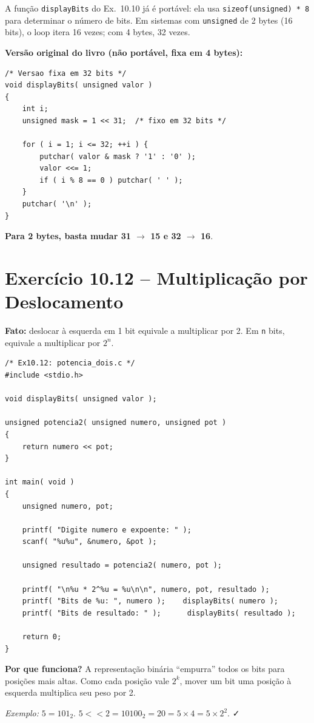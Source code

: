 \documentclass[12pt,a4paper]{article}
\begin{document}
\begin{respostabox}
A função \texttt{displayBits} do Ex.~10.10 já é portável: ela usa
\texttt{sizeof(unsigned) * 8} para determinar o número de bits. Em sistemas com
\texttt{unsigned} de 2 bytes (16 bits), o loop itera 16 vezes; com 4 bytes,
32 vezes.

\textbf{Versão original do livro (não portável, fixa em 4 bytes):}
\begin{lstlisting}
/* Versao fixa em 32 bits */
void displayBits( unsigned valor )
{
    int i;
    unsigned mask = 1 << 31;  /* fixo em 32 bits */

    for ( i = 1; i <= 32; ++i ) {
        putchar( valor & mask ? '1' : '0' );
        valor <<= 1;
        if ( i % 8 == 0 ) putchar( ' ' );
    }
    putchar( '\n' );
}
\end{lstlisting}

\textbf{Para 2 bytes, basta mudar 31 $\to$ 15 e 32 $\to$ 16}.
\end{respostabox}

\section{Exercício 10.12 -- Multiplicação por Deslocamento}

\begin{respostabox}
\textbf{Fato:} deslocar à esquerda em 1 bit equivale a multiplicar por 2.
Em \texttt{n} bits, equivale a multiplicar por $2^n$.

\begin{lstlisting}
/* Ex10.12: potencia_dois.c */
#include <stdio.h>

void displayBits( unsigned valor );

unsigned potencia2( unsigned numero, unsigned pot )
{
    return numero << pot;
}

int main( void )
{
    unsigned numero, pot;

    printf( "Digite numero e expoente: " );
    scanf( "%u%u", &numero, &pot );

    unsigned resultado = potencia2( numero, pot );

    printf( "\n%u * 2^%u = %u\n\n", numero, pot, resultado );
    printf( "Bits de %u: ", numero );    displayBits( numero );
    printf( "Bits de resultado: " );      displayBits( resultado );

    return 0;
}
\end{lstlisting}

\textbf{Por que funciona?} A representação binária ``empurra'' todos os bits para
posições mais altas. Como cada posição vale $2^k$, mover um bit uma posição à
esquerda multiplica seu peso por 2.

\textit{Exemplo:} $5 = 101_2$. $5 << 2 = 10100_2 = 20 = 5 \times 4 = 5 \times 2^2$. ✓
\end{respostabox}
\end{document}

